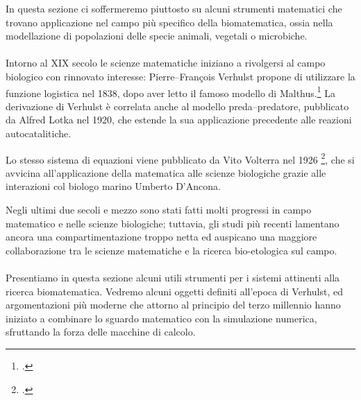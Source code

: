 In questa sezione ci soffermeremo piuttosto su alcuni strumenti matematici che trovano applicazione nel campo
più specifico della biomatematica, ossia nella modellazione di popolazioni delle specie animali, vegetali
o microbiche.

\paragraph{}
Intorno al XIX secolo le scienze matematiche iniziano a rivolgersi al campo biologico con rinnovato interesse:
Pierre--François Verhulst propone di utilizzare la funzione logistica nel 1838, dopo aver letto il famoso
modello di Malthus.\footcite{malthus1986essay}
La derivazione di Verhulst è correlata anche al modello preda--predatore, pubblicato da Alfred
Lotka nel 1920, che estende la sua applicazione precedente alle reazioni autocatalitiche.

Lo stesso sistema di equazioni viene pubblicato da Vito Volterra nel 1926
\footcite{vito},
che si avvicina all'applicazione della matematica alle scienze biologiche grazie alle interazioni col
biologo marino Umberto D'Ancona.

Negli ultimi due secoli e mezzo sono stati fatti molti progressi in campo matematico e nelle scienze biologiche;
tuttavia, gli studi più recenti lamentano ancora una compartimentazione troppo netta ed auspicano una maggiore
collaborazione tra le scienze matematiche e la ricerca bio-etologica sul campo.

\paragraph{}
Presentiamo in questa sezione alcuni utili strumenti per i sistemi attinenti alla ricerca biomatematica.
Vedremo alcuni oggetti definiti all'epoca di Verhulst, ed argomentazioni più moderne che attorno al principio
del terzo millennio hanno iniziato a combinare lo sguardo matematico con la simulazione numerica,
sfruttando la forza delle macchine di calcolo.






